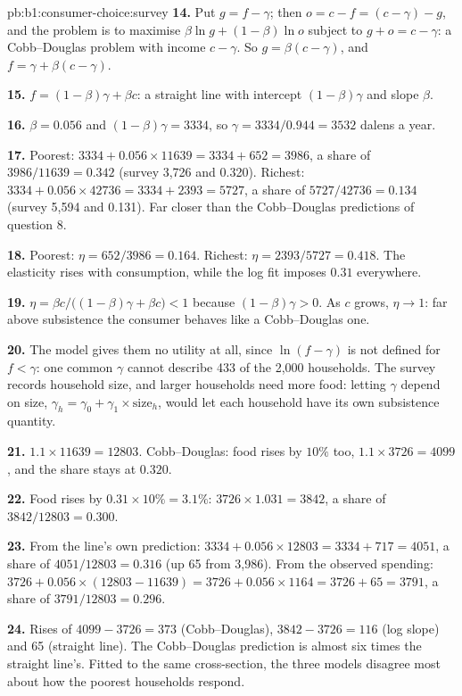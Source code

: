 \begin{solution}{pb:b1:consumer-choice:survey}
\textbf{14.} Put $g = f - \gamma$; then $o = c - f = (c - \gamma) - g$, and the problem is
to maximise $\beta\ln g + (1 - \beta)\ln o$ subject to $g + o = c - \gamma$: a
Cobb--Douglas problem with income $c - \gamma$. So $g = \beta(c - \gamma)$, and
$f = \gamma + \beta(c - \gamma)$.

\textbf{15.} $f = (1 - \beta)\gamma + \beta c$: a straight line with intercept
$(1 - \beta)\gamma$ and slope $\beta$.

\textbf{16.} $\beta = 0.056$ and $(1 - \beta)\gamma = 3334$, so
$\gamma = 3334/0.944 = 3532$ dalens a year.

\textbf{17.} Poorest: $3334 + 0.056 \times 11639 = 3334 + 652 = 3986$, a share of
$3986/11639 = 0.342$ (survey 3,726 and 0.320). Richest:
$3334 + 0.056 \times 42736 = 3334 + 2393 = 5727$, a share of
$5727/42736 = 0.134$ (survey 5,594 and 0.131). Far closer than the
Cobb--Douglas predictions of question 8.

\textbf{18.} Poorest: $\eta = 652/3986 = 0.164$. Richest: $\eta = 2393/5727 = 0.418$.
The elasticity rises with consumption, while the log fit imposes $0.31$
everywhere.

\textbf{19.} $\eta = \beta c/\bigl((1 - \beta)\gamma + \beta c\bigr) < 1$ because
$(1 - \beta)\gamma > 0$. As $c$ grows, $\eta \to 1$: far above subsistence the
consumer behaves like a Cobb--Douglas one.

\textbf{20.} The model gives them no utility at all, since $\ln(f - \gamma)$ is not
defined for $f < \gamma$: one common $\gamma$ cannot describe 433 of the 2,000
households. The survey records household size, and larger households need
more food: letting $\gamma$ depend on size, $\gamma_h = \gamma_0 + \gamma_1 \times \text{size}_h$,
would let each household have its own subsistence quantity.

\textbf{21.} $1.1 \times 11639 = 12803$. Cobb--Douglas: food rises by $10\%$ too,
$1.1 \times 3726 = 4099$, and the share stays at $0.320$.

\textbf{22.} Food rises by $0.31 \times 10\% = 3.1\%$: $3726 \times 1.031 = 3842$, a share of
$3842/12803 = 0.300$.

\textbf{23.} From the line's own prediction: $3334 + 0.056 \times 12803 = 3334 + 717 = 4051$,
a share of $4051/12803 = 0.316$ (up 65 from 3,986). From the observed
spending: $3726 + 0.056 \times (12803 - 11639) = 3726 + 0.056 \times 1164 = 3726 + 65 = 3791$,
a share of $3791/12803 = 0.296$.

\textbf{24.} Rises of $4099 - 3726 = 373$ (Cobb--Douglas), $3842 - 3726 = 116$ (log
slope) and 65 (straight line). The Cobb--Douglas prediction is almost six
times the straight line's. Fitted to the same cross-section, the three
models disagree most about how the poorest households respond.


\end{solution}
